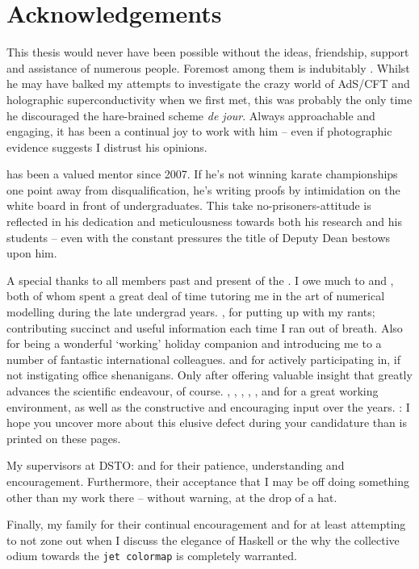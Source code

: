 \chapter{Acknowledgements}

This thesis would never have been possible without the ideas, friendship, support and assistance of numerous people.
Foremost among them is indubitably .
Whilst he may have balked my attempts to investigate the crazy world of AdS/CFT and holographic superconductivity when we first met, this was probably the only time he discouraged the hare-brained scheme \emph{de jour}.
Always approachable and engaging, it has been a continual joy to work with him -- even if photographic evidence suggests I distrust his opinions.

 has been a valued mentor since 2007.
If he's not winning karate championships one point away from disqualification, he's writing proofs by intimidation on the white board in front of undergraduates.
This take no-prisoners-attitude is reflected in his dedication and meticulousness towards both his research and his students -- even with the constant pressures the title of Deputy Dean bestows upon him.

A special thanks to all members past and present of the .
I owe much to  and , both of whom spent a great deal of time tutoring me in the art of numerical modelling during the late undergrad years. 
, for putting up with my rants; contributing succinct and useful information each time I ran out of breath. 
Also for being a wonderful `working' holiday companion and introducing me to a number of fantastic international colleagues.
 and  for actively participating in, if not instigating office shenanigans.
Only after offering valuable insight that greatly advances the scientific endeavour, of course. 
, , , ,  ,  and  for a great working environment, as well as the constructive and encouraging input over the years.
: I hope you uncover more about this elusive defect during your candidature than is printed on these pages. 

My supervisors at DSTO: %
%
 and  for their patience, understanding and encouragement. Furthermore, their acceptance that I may be off doing something other than my work there -- without warning, at the drop of a hat.

Finally, my family for their continual encouragement and for at least attempting to not zone out when I discuss the elegance of Haskell or the why the collective odium towards the \texttt{jet colormap} is completely warranted. 